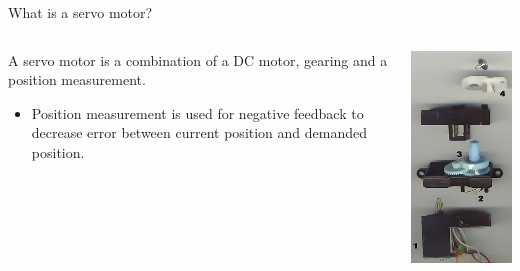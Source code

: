 \documentclass[compress]{beamer}
\begin{document}
\begin{frame}{What is a servo motor?}

    \begin{columns}
        \begin{column}{0.5\linewidth}
    A servo motor is a combination of a DC motor, gearing and a position
    measurement.

    \begin{itemize}

        \item Position measurement is used for negative feedback to decrease error
            between current position and demanded position.
    \end{itemize}

            
        \end{column}
        \begin{column}{0.5\linewidth}
            \begin{center}
                \includegraphics[width=0.8\linewidth]{image17}


\end{center}
\end{column}
\end{columns}
\end{frame}
\end{document}
